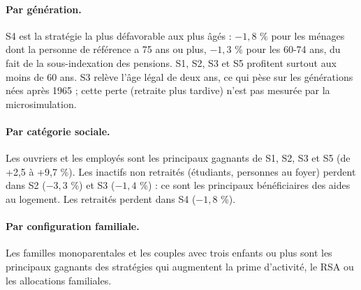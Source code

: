 \paragraph{Par génération.} S4 est la stratégie la plus défavorable aux plus âgés : $-1{,}8$ \% pour les ménages dont la
personne de référence a 75 ans ou plus, $-1{,}3$ \% pour les 60-74 ans, du fait de la sous-indexation des pensions.
S1, S2, S3 et S5 profitent surtout aux moins de 60 ans. S3 relève l'âge légal de deux ans, ce qui pèse sur les
générations nées après 1965 ; cette perte (retraite plus tardive) n'est pas mesurée par la microsimulation.

\begin{table}[htbp]\centering\scriptsize
\caption{Variation du niveau de vie par âge de la personne de référence (€ par unité de consommation et par an).}
\end{table}

\paragraph{Par catégorie sociale.} Les ouvriers et les employés sont les principaux gagnants de S1, S2, S3 et S5 (de
+2,5 à +9,7 \%). Les inactifs non retraités (étudiants, personnes au foyer) perdent dans S2 ($-3{,}3$ \%) et S3
($-1{,}4$ \%) : ce sont les principaux bénéficiaires des aides au logement. Les retraités perdent dans S4 ($-1{,}8$ \%).

\begin{table}[htbp]\centering\scriptsize
\caption{Variation du niveau de vie par catégorie sociale de la personne de référence (€ par unité de consommation et
par an).}
\end{table}

\paragraph{Par configuration familiale.} Les familles monoparentales et les couples avec trois enfants ou plus sont
les principaux gagnants des stratégies qui augmentent la prime d'activité, le RSA ou les allocations familiales.

\begin{table}[htbp]\centering\scriptsize
\caption{Variation du niveau de vie par configuration familiale (€ par unité de consommation et par an).}
\end{table}

